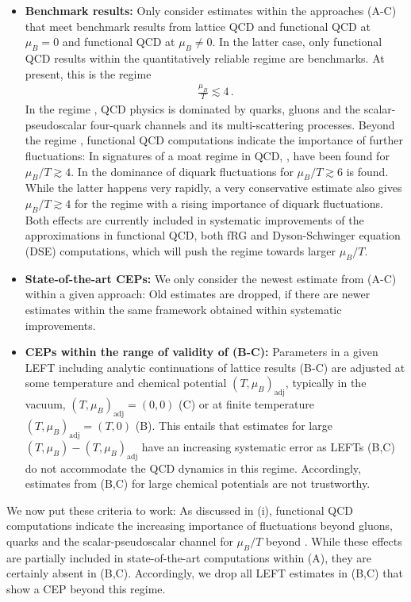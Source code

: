 \documentclass[reprint,twocolumn,superscriptaddress,preprintnumbers,amsmath,amssymb,aps,prd,floatfix]{revtex4-2}
\begin{document}
\begin{itemize}
\item[(i)] \textbf{Benchmark results:} Only consider estimates within the approaches (A-C) that meet benchmark results from lattice QCD and functional QCD at $\mu_B=0$ and functional QCD at $\mu_B\neq 0$. In the latter case, only functional QCD results within the quantitatively reliable regime are benchmarks. At present, this is the regime 
%
\begin{align}
    \frac{\mu_B}{T} \lesssim 4\,. \label{eq:fQCDmuBT}
\end{align}
% 
In the regime , QCD physics is dominated by quarks, gluons and the scalar-pseudoscalar four-quark channels and its multi-scattering processes. Beyond the regime , functional QCD computations indicate the importance of further fluctuations: In \cite{Fu:2019hdw} signatures of a moat regime in QCD, \cite{Pisarski:2021qof}, have been found for $\mu_B/T \gtrsim 4$. In \cite{Braun:2019aow} the dominance of diquark fluctuations for $\mu_B/T \gtrsim 6$ is found. While the latter happens very rapidly, a very conservative estimate also gives  $\mu_B/T \gtrsim 4$ for the regime with a rising importance of diquark fluctuations. Both effects are currently included in systematic improvements of the approximations in functional QCD, both fRG and Dyson-Schwinger equation (DSE) computations, which will push the regime  towards larger $\mu_B/T$. 

\item[(ii)] \textbf{State-of-the-art CEPs:} We only consider the newest estimate from (A-C) within a given approach: Old estimates are dropped, if there are newer estimates within the same framework obtained within systematic improvements. 

\item[(iii)] \textbf{CEPs within the range of validity of (B-C):} Parameters in a given LEFT including analytic continuations of lattice results (B-C) are adjusted at some temperature and chemical potential $(T,\mu_B)_\textrm{adj}$, typically in the vacuum, $(T,\mu_B)_\textrm{adj}=(0,0)$ (C) or at finite temperature $(T,\mu_B)_\textrm{adj}=(T,0)$ (B). This entails that estimates for large $(T,\mu_B)-(T,\mu_B)_\textrm{adj}$ have an increasing systematic error as LEFTs (B,C) do not accommodate the QCD dynamics in this regime. Accordingly, estimates from (B,C) for large chemical potentials are not trustworthy.  
\end{itemize}
%
We now put these criteria to work: As discussed in (i), functional QCD computations indicate the increasing importance of fluctuations beyond gluons, quarks and the scalar-pseudoscalar channel for $\mu_B/T$ beyond . While these effects are partially included in state-of-the-art computations within (A), they are certainly absent in (B,C). Accordingly, we drop all LEFT estimates in (B,C) that show a CEP beyond this regime. 
\end{document}
